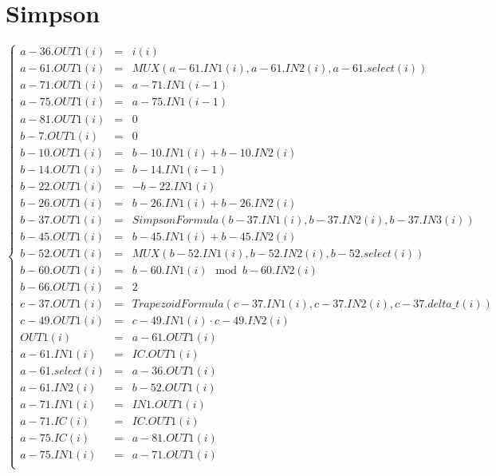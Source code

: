 \documentclass{article}
\begin{document}
\section{Simpson}
$$
\left\{\begin{array}{lcl}
	a-36.OUT1(i) &=& i\left(i\right)\\
	a-61.OUT1(i) &=& MUX\left(a-61.IN1\left(i\right), a-61.IN2\left(i\right), a-61.select\left(i\right)\right)\\
	a-71.OUT1(i) &=& a-71.IN1\left(i-1\right)\\
	a-75.OUT1(i) &=& a-75.IN1\left(i-1\right)\\
	a-81.OUT1(i) &=& 0\\
	b-7.OUT1(i) &=& 0\\
	b-10.OUT1(i) &=& b-10.IN1\left(i\right) + b-10.IN2\left(i\right)\\
	b-14.OUT1(i) &=& b-14.IN1\left(i-1\right)\\
	b-22.OUT1(i) &=& -b-22.IN1\left(i\right)\\
	b-26.OUT1(i) &=& b-26.IN1\left(i\right) + b-26.IN2\left(i\right)\\
	b-37.OUT1(i) &=& SimpsonFormula\left(b-37.IN1\left(i\right), b-37.IN2\left(i\right), b-37.IN3\left(i\right)\right)\\
	b-45.OUT1(i) &=& b-45.IN1\left(i\right) + b-45.IN2\left(i\right)\\
	b-52.OUT1(i) &=& MUX\left(b-52.IN1\left(i\right), b-52.IN2\left(i\right), b-52.select\left(i\right)\right)\\
	b-60.OUT1(i) &=& b-60.IN1\left(i\right) \mod  b-60.IN2\left(i\right)\\
	b-66.OUT1(i) &=& 2\\
	c-37.OUT1(i) &=& TrapezoidFormula\left(c-37.IN1\left(i\right), c-37.IN2\left(i\right), c-37.delta\_t\left(i\right)\right)\\
	c-49.OUT1(i) &=& c-49.IN1\left(i\right) \cdot  c-49.IN2\left(i\right)\\
	OUT1(i) &=& a-61.OUT1\left(i\right)\\
	a-61.IN1(i) &=& IC.OUT1\left(i\right)\\
	a-61.select(i) &=& a-36.OUT1\left(i\right)\\
	a-61.IN2(i) &=& b-52.OUT1\left(i\right)\\
	a-71.IN1(i) &=& IN1.OUT1\left(i\right)\\
	a-71.IC(i) &=& IC.OUT1\left(i\right)\\
	a-75.IC(i) &=& a-81.OUT1\left(i\right)\\
	a-75.IN1(i) &=& a-71.OUT1\left(i\right)\\

\end{array}$$
\end{document}

